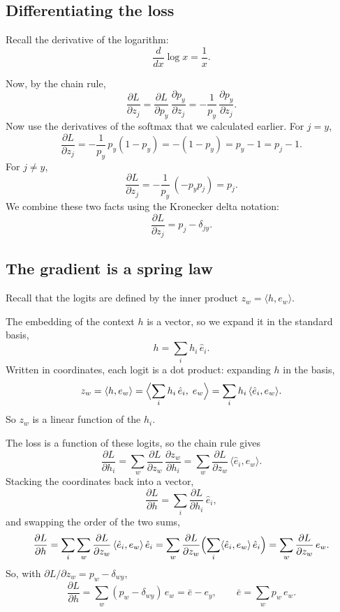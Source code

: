 \documentclass[11pt]{article}
\begin{document}
\subsection*{Differentiating the loss}

Recall the derivative of the logarithm:
\[
  \frac{d}{dx}\log x = \frac{1}{x}.
\]

Now, by the chain rule,
\[
  \frac{\partial L}{\partial z_j}
    = \frac{\partial L}{\partial p_y}\,\frac{\partial p_y}{\partial z_j}
    = -\frac{1}{p_y}\,\frac{\partial p_y}{\partial z_j}.
\]
Now use the derivatives of the softmax that we calculated earlier. For $j = y$,
\[
  \frac{\partial L}{\partial z_j} = -\frac{1}{p_y}\,p_y(1-p_y) = -(1-p_y) = p_y - 1 = p_j - 1 .
\]
For $j \neq y$,
\[
  \frac{\partial L}{\partial z_j} = -\frac{1}{p_y}\,(-p_y p_j) = p_j .
\]
We combine these two facts using the Kronecker delta notation:
\[
  \frac{\partial L}{\partial z_j} = p_j - \delta_{jy}.
\]

\subsection*{The gradient is a spring law}

Recall that the logits are defined by the inner product $z_w = \langle h, e_w\rangle$.

The embedding of the context $h$ is a vector, so we expand it in the standard basis,
\[
  h = \sum_i h_i\,\hat{e}_i.
\] Written in coordinates, each logit is a dot product: expanding $h$ in the basis,
\[
  z_w = \langle h, e_w\rangle
      = \Bigl\langle \sum_i h_i\,\hat{e}_i,\; e_w \Bigr\rangle
      = \sum_i h_i\,\langle \hat{e}_i, e_w\rangle.
\]
So $z_w$ is a linear function of the $h_i$.

The loss is a function of these logits, so the chain rule gives
\[
  \frac{\partial L}{\partial h_i}
    = \sum_w \frac{\partial L}{\partial z_w}\,\frac{\partial z_w}{\partial h_i}
    = \sum_w \frac{\partial L}{\partial z_w}\, \langle \hat{e}_i, e_w\rangle.
\]
Stacking the coordinates back into a vector,
\[
  \frac{\partial L}{\partial h} = \sum_i \frac{\partial L}{\partial h_i}\,\hat{e}_i ,
\]
and swapping the order of the two sums,
\[
  \frac{\partial L}{\partial h}
    = \sum_i \sum_w \frac{\partial L}{\partial z_w}\,\langle \hat{e}_i, e_w\rangle\,\hat{e}_i
    = \sum_w \frac{\partial L}{\partial z_w} \Bigl( \sum_i \langle \hat{e}_i, e_w\rangle\,\hat{e}_i \Bigr)
    = \sum_w \frac{\partial L}{\partial z_w}\, e_w .
\]
So, with $\partial L/\partial z_w = p_w - \delta_{wy}$,
\[
  \frac{\partial L}{\partial h} = \sum_w (p_w - \delta_{wy})\, e_w = \bar{e} - e_y,
  \qquad \bar{e} = \sum_w p_w\, e_w .
\]
\end{document}
